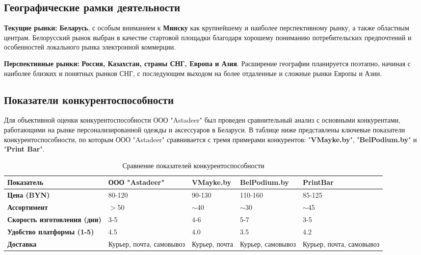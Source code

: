 \subsection{Географические рамки деятельности}

\textbf{Текущие рынки:} \textbf{Беларусь}, с особым вниманием к \textbf{Минску} как крупнейшему и наиболее перспективному рынку, а также областным центрам.  Белорусский рынок выбран в качестве стартовой площадки благодаря хорошему пониманию потребительских предпочтений и особенностей локального рынка электронной коммерции.

\textbf{Перспективные рынки:}  \textbf{Россия, Казахстан, страны СНГ, Европа и Азия}.  Расширение географии планируется поэтапно, начиная с наиболее близких и понятных рынков СНГ, с последующим выходом на более отдаленные и сложные рынки Европы и Азии.

\subsection{Показатели конкурентоспособности}

Для объективной оценки конкурентоспособности ООО "Astadeer" был проведен сравнительный анализ с основными конкурентами, работающими на рынке персонализированной одежды и аксессуаров в Беларуси.  В таблице ниже представлены ключевые показатели конкурентоспособности, по которым ООО "Astadeer" сравнивается с тремя примерами конкурентов: "\textbf{VMayke.by}", "\textbf{BelPodium.by}" и "\textbf{Print Bar}".

\vspace{0.3cm}

\begin{table}[ht]
    \centering
    \begin{tabularx}{\linewidth}{|l|X|X|X|X|}
        \hline
        \textbf{Показатель} & \textbf{ООО "Astadeer"} & \textbf{VMayke.\newline by} & \textbf{BelPodium.\newline by} & \textbf{Print\newline Bar} \\
        \hline
        \textbf{Цена (BYN)} & 80-120 & 90-130 & 110-160 & 85-125 \\
        \hline
        \textbf{Ассортимент} & $>$50 & $\sim$40 & $\sim$30 & $\sim$45 \\
        \hline
        \textbf{Скорость изготовления (дни)} & 3-5 & 4-6 & 5-7 & 3-5 \\
        \hline
        \textbf{Удобство платформы (1-5)} & 4.5 & 4.0 & 3.5 & 4.2 \\
        \hline
        \textbf{Доставка} & Курьер, почта, самовывоз & Курьер, почта & Курьер, самовывоз & Курьер, почта, самовывоз \\
        \hline
    \end{tabularx}
    \caption{Сравнение показателей конкурентоспособности}
\end{table}

